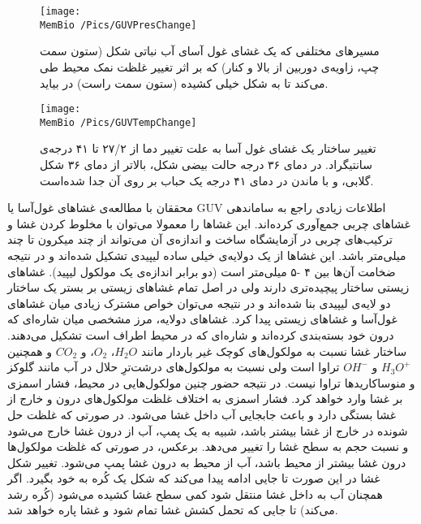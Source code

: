 
\begin{figure}[t]
\begin{center}
\texttt{[image: \\MemBio /Pics/GUVPresChange]}
\caption{
مسیر‌های مختلفی که یک غشای غول آسای آب نباتی شکل (ستون سمت چپ، زاویه‌ی دوربین از بالا و کنار) که بر اثر تغییر غلظت نمک محیط طی می‌کند تا به شکل خیلی کشیده (ستون سمت راست) در بیاید.
}
\label{fig:GUVPresChange}
\end{center}
\end{figure}

\begin{figure}[t]
\begin{center}
\texttt{[image: \\MemBio /Pics/GUVTempChange]}
\caption{
تغییر ساختار یک غشای غول ‌آسا به علت تغییر دما از ۲۷/۲ تا ۴۱ درجه‌ی سانتیگراد. در دمای ۳۶ درجه حالت بیضی شکل، بالاتر از دمای ۳۶ شکل گلابی، و با ماندن در دمای ۴۱ درجه یک حباب بر روی آن جدا شده‌است.
}
\label{fig:GUVTempChange}
\end{center}
\end{figure}


محققان با مطالعه‌ی غشا‌های غول‌آسا
 یا 
 GUV اطلاعات  زیادی راجع به ساماندهی غشاهای چربی جمع‌آوری کرده‌اند. این غشا‌ها را معمولا می‌توان با  مخلوط کردن  
 غشا‌ و ترکیب‌های چربی در آزمایشگاه ساخت
 \cite{GUVmaking2009}
و اندازه‌ی آن می‌تواند از چند میکرون تا چند میلی‌متر   باشد.
این غشاها از یک دولایه‌ی خیلی ساده لیپیدی تشکیل شده‌اند و در نتیجه‌ ضخامت‌ آن‌ها بین ۴ -۵ میلی‌متر است (دو برابر اندازه‌ی یک مولکول لیپید). غشاهای زیستی ساختار پیچیده‌تری دارند ولی در اصل تمام‌ غشاهای زیستی بر بستر یک ساختار دو لایه‌ی لیپیدی بنا شده‌اند و در نتیجه می‌توان خواص مشترک زیادی میان غشا‌های غول‌آسا و غشاهای زیستی پیدا کرد.
غشاهای دولایه، مرز مشخصی میان شاره‌‌‌ای که درون خود بسته‌بندی کرده‌اند و شاره‌ای که در محیط اطراف است تشکیل می‌دهند. ساختار غشا نسبت به مولکول‌های کوچک غیر باردار مانند 
$H_2O$، 
$O_2$،
و 
$CO_2$
و همچنین
$H_3O^+$
و
$OH^-$
تراوا است ولی نسبت به مولکول‌های درشت‌ترِ حلال در آب مانند گلوکز
و منوساکارید‌ها
 تراوا نیست. در نتیجه‌ حضور چنین مولکول‌هایی در محیط، فشار اسمزی بر غشا وارد خواهد کرد. فشار اسمزی به اختلاف غلظت مولکول‌های درون و خارج از غشا بستگی دارد و باعث جابجایی آب داخل غشا می‌شود. در صورتی که غلظت حل شونده در خارج از غشا بیشتر باشد، شبیه به یک پمپ، آب از درون غشا خارج می‌شود و نسبت حجم به سطح غشا را تغییر می‌دهد. برعکس، در صورتی که غلظت مولکول‌ها درون غشا بیشتر از محیط باشد، آب از محیط به درون غشا پمپ می‌شود. تغییر شکل غشا در این صورت تا جایی ادامه پیدا می‌کند که شکل یک کُره به خود بگیرد. اگر همچنان آب به داخل غشا منتقل شود کمی سطح غشا کشیده می‌شود (کُره رشد می‌کند) تا جایی که تحمل کشش غشا تمام شود و غشا پاره خواهد شد.





